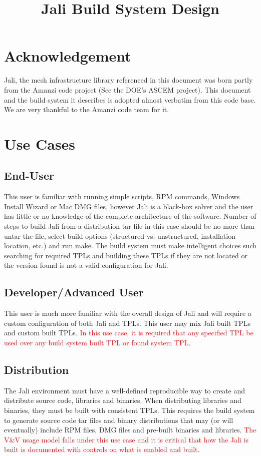 \documentclass[12pt]{article}
\begin{document}
\title{Jali Build System Design}

\section{Acknowledgement}

Jali, the mesh infrastructure library referenced in this document was born partly from the Amanzi code project (See the DOE's ASCEM project). This document and the build system it describes is adopted almost verbatim from this code base. We are very thankful to the Amanzi code team for it.

\section{Use Cases}
\subsection{End-User}
This user is familiar with running simple scripts, RPM commands, Windows Install Wizard or Mac DMG files,
however Jali is a black-box solver and the user has little or no knowledge of the complete architecture
of the software.
Number of steps to build Jali from a distribution tar file in this case should be no more than untar the file,
select build options (structured vs. unstructured, installation location, etc.) and run make.  The 
build system must make intelligent choices such searching for required TPLs and building these
TPLs if they are not located or the version found is not a valid configuration for Jali.

\subsection{Developer/Advanced User}
This user is much more familiar with the overall design of Jali and will require a custom configuration
of both Jali and TPLs. This user may mix Jali built TPLs and custom built TPLs. \textcolor{red}{In this use case, it
is required that any specified TPL be used over any build system built TPL or found system TPL.} 

\subsection{Distribution}
The Jali environment must have a well-defined reproducible way to create and distribute source code, libraries
and binaries. When distributing libraries and binaries, they must be built with consistent TPLs. This requires the build
system to generate source code tar files and binary distributions that may (or will eventually) include RPM files,
DMG files and pre-built binaries and libraries. \textcolor{red}{The V\&V usage model falls under this use case and it
is critical that how the Jali is built is documented with controls on what is enabled and built.}
\end{document}
